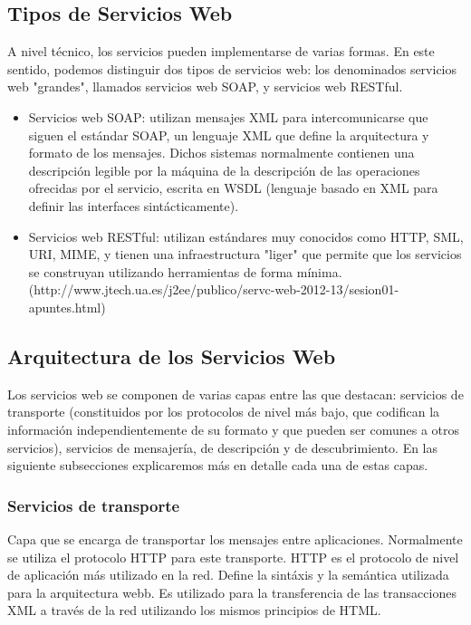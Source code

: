 	
	\subsection{Tipos de Servicios Web}
	\label{cap2:subsec:servicios_web}
	A nivel técnico, los servicios pueden implementarse de varias formas. En este sentido, podemos distinguir dos tipos de servicios web: los denominados servicios web "grandes", llamados servicios web SOAP, y servicios web RESTful.
	\begin{itemize}
		\item Servicios web SOAP: utilizan mensajes XML para intercomunicarse que siguen el estándar SOAP, un lenguaje XML que define la arquitectura y formato de los mensajes. Dichos sistemas normalmente contienen una descripción legible por la máquina de la descripción de las operaciones ofrecidas por el servicio, escrita en WSDL (lenguaje basado en XML para definir las interfaces sintácticamente).
		\item Servicios web RESTful: utilizan estándares muy conocidos como HTTP, SML, URI, MIME, y tienen una infraestructura "liger" que permite que los servicios se construyan utilizando herramientas de forma mínima. (http://www.jtech.ua.es/j2ee/publico/servc-web-2012-13/sesion01-apuntes.html)
	\end{itemize}
	
	
	\subsection{Arquitectura de los Servicios Web}
	\label{cap2:subsec:servicios_web}
	
	Los servicios web se componen de varias capas entre las que destacan: servicios de transporte (constituidos por los protocolos de nivel más bajo, que codifican la información independientemente de su formato y que pueden ser comunes a otros servicios), servicios de mensajería, de descripción y de descubrimiento. En las siguiente subsecciones explicaremos más en detalle cada una de estas capas.
	
	\subsubsection{Servicios de transporte}
	
		Capa que se encarga de transportar los mensajes entre aplicaciones. Normalmente se utiliza el protocolo HTTP para este 		transporte. HTTP es el protocolo de nivel de aplicación más utilizado en la red. Define la sintáxis y la semántica utilizada 		para la arquitectura webb. Es utilizado para la transferencia de las transacciones XML a través de la red utilizando los mismos 	principios de HTML.
	
